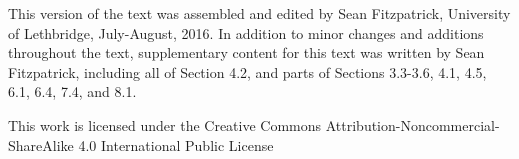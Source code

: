 \vspace{1in}


This version of the text was assembled and edited by Sean Fitzpatrick, University of Lethbridge, July-August, 2016. In addition to minor changes and additions throughout the text, supplementary content for this text was written by Sean Fitzpatrick, including all of Section 4.2, and parts of Sections 3.3-3.6, 4.1, 4.5, 6.1, 6.4, 7.4, and 8.1.

\medskip

This work is licensed under the Creative Commons Attribution-Noncommercial-ShareAlike 4.0 International Public License

